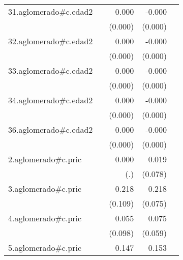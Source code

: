 {\begin{longtable}{l*{4}{D{.}{.}{-1}}}
\addlinespace
31.aglomerado#c.edad2&                     &       0.000         &      -0.000\sym{**} &                     \\
            &                     &     (0.000)         &     (0.000)         &                     \\
\addlinespace
32.aglomerado#c.edad2&                     &       0.000\sym{*}  &      -0.000         &                     \\
            &                     &     (0.000)         &     (0.000)         &                     \\
\addlinespace
33.aglomerado#c.edad2&                     &       0.000\sym{*}  &      -0.000         &                     \\
            &                     &     (0.000)         &     (0.000)         &                     \\
\addlinespace
34.aglomerado#c.edad2&                     &       0.000         &      -0.000\sym{**} &                     \\
            &                     &     (0.000)         &     (0.000)         &                     \\
\addlinespace
36.aglomerado#c.edad2&                     &       0.000\sym{*}  &      -0.000         &                     \\
            &                     &     (0.000)         &     (0.000)         &                     \\
\addlinespace
2.aglomerado#c.pric&                     &       0.000         &       0.019         &                     \\
            &                     &         (.)         &     (0.078)         &                     \\
\addlinespace
3.aglomerado#c.pric&                     &       0.218\sym{*}  &       0.218\sym{**} &                     \\
            &                     &     (0.109)         &     (0.075)         &                     \\
\addlinespace
4.aglomerado#c.pric&                     &       0.055         &       0.075         &                     \\
            &                     &     (0.098)         &     (0.059)         &                     \\
\addlinespace
5.aglomerado#c.pric&                     &       0.147         &       0.153\sym{*}  &                     \\

\end{longtable}}
